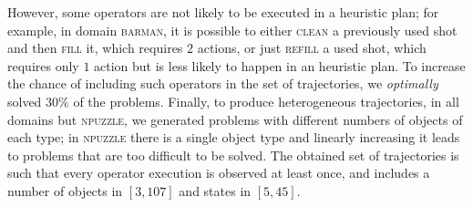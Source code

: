 \documentclass{article}
\theoremstyle{definition}
\theoremstyle{remark}
\begin{document}
{%
However, some operators are not likely to be executed in a heuristic plan; for example, in domain \textsc{barman}, it is possible to either \textsc{clean} a previously used shot and then \textsc{fill} it, which requires $2$ actions, or just \textsc{refill} a used shot, which requires only $1$ action but is less likely to happen in an heuristic plan. To increase the chance of including such operators in the set of trajectories, we \emph{optimally} solved $30\%$ of the problems.
%
Finally, to produce heterogeneous trajectories, in all domains but \textsc{npuzzle}, we generated problems with different numbers of objects of each type; in \textsc{npuzzle} there is a single object type and linearly increasing it leads to problems that are too difficult to be solved. 
%
The obtained set of trajectories is such that every operator execution is observed at least once, and includes a number of objects in $[3, 107]$ and states in $[5, 45]$\footnotemark[1].
%
}
\end{document}
